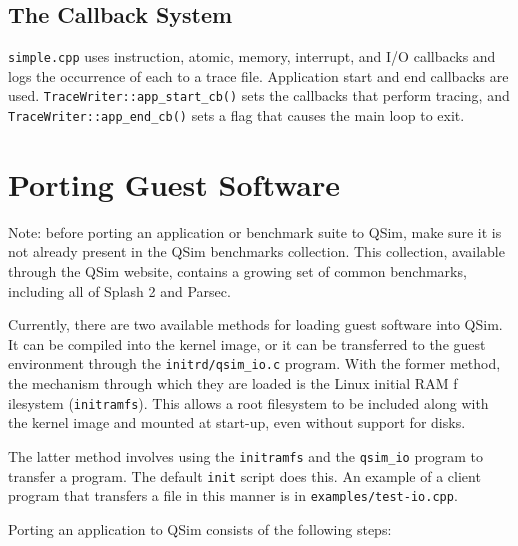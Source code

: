 \documentclass[letterpaper, 10pt]{book}
\begin{document}
\section{The Callback System}

\texttt{simple.cpp} uses instruction, atomic, memory, interrupt, and I/O
callbacks and logs the occurrence of each to a trace file. Application start
and end callbacks are used. \texttt{TraceWriter::app\_start\_cb()} sets the
callbacks that perform tracing, and \texttt{TraceWriter::app\_end\_cb()}
sets a flag that causes the main loop to exit.

\chapter{Porting Guest Software} \label{chap:porting}
Note: before porting an application or benchmark suite to QSim, make sure it is 
not already present in the QSim benchmarks collection. This collection,
available through the QSim website, contains a growing set of common benchmarks,
including all of Splash 2 and Parsec.

Currently, there are two available methods for loading guest software into QSim.
It can be compiled into the kernel image, or it can be transferred to the guest
environment through the \texttt{initrd/qsim\_io.c} program. With the former 
method, the mechanism through which they are loaded is the Linux initial RAM f
ilesystem (\texttt{initramfs}). This allows a root filesystem to be included
along with the kernel image and mounted at start-up, even without support for
disks.

The latter method involves using the \texttt{initramfs} and the
\texttt{qsim\_io} program to transfer a program. The default \texttt{init}
script does this. An example of a client program that transfers a file in this
manner is in \texttt{examples/test-io.cpp}.

Porting an application to QSim consists of the following steps:
\end{document}
